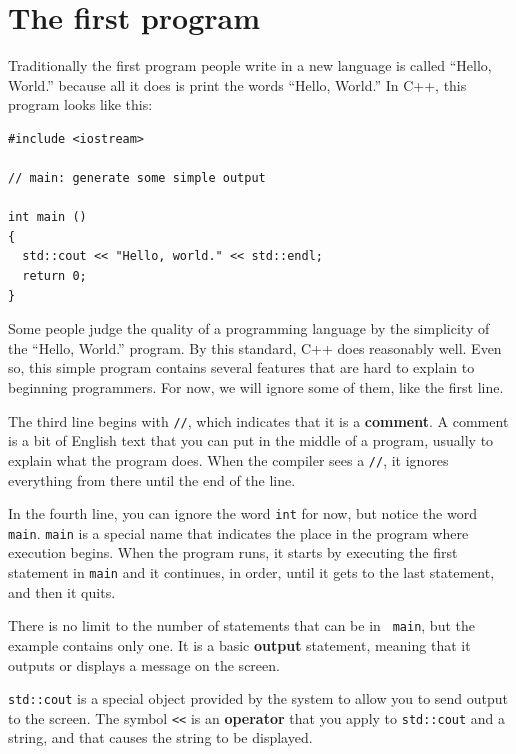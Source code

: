 \section{The first program}
\label{hello}

Traditionally the first program people write in a new language
is called ``Hello, World.'' because all it does is print the
words ``Hello, World.''  In C++, this program looks like this:


\begin{lstlisting}
#include <iostream>

// main: generate some simple output

int main ()
{
  std::cout << "Hello, world." << std::endl;
  return 0;
}
\end{lstlisting}
%

Some people judge the quality of a programming language by
the simplicity of the ``Hello, World.'' program.  By this
standard, C++ does reasonably well.  Even so, this simple
program contains several features that are hard to explain to
beginning programmers.  For now, we will ignore some of
them, like the first line.


The third line begins with {\tt //}, which indicates
that it is a {\bf comment}.  A comment is a bit of
English text that you can put in the middle of a program,
usually to explain what the program does.  When the compiler
sees a {\tt //}, it ignores everything from there until the end
of the line.

In the fourth line, you can ignore the word {\tt int}
for now, but notice the word {\tt main}.  {\tt main} is a
special name that indicates the place in the program where execution
begins.  When the program runs, it starts by executing the first
statement in {\tt main} and it continues, in order, until it gets
to the last statement, and then it quits.


There is no limit to the number of statements that can be in {\tt
main}, but the example contains only one.  It is a basic {\bf
output} statement, meaning that it outputs or displays a message on
the screen.  

{\tt std::cout} is a special object provided by the system to allow
you to send output to the screen.  The symbol {\tt <<} is an
{\bf operator} that you apply to {\tt std::cout} and a string, and that
causes the string to be displayed.

